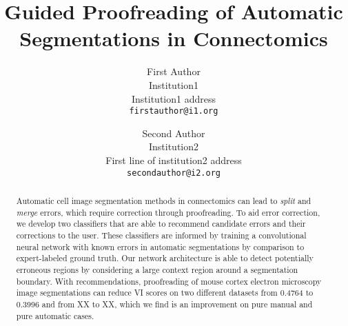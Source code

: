 \documentclass[10pt,twocolumn,letterpaper]{article}
\begin{document}
\title{Guided Proofreading of Automatic Segmentations in Connectomics}

\author{First Author\\
Institution1\\
Institution1 address\\
{\tt\small firstauthor@i1.org}
\and
Second Author\\
Institution2\\
First line of institution2 address\\
{\tt\small secondauthor@i2.org}
}

\maketitle

\begin{abstract}
Automatic cell image segmentation methods in connectomics can lead to \emph{split} and \emph{merge} errors, which require correction through proofreading. To aid error correction, we develop two classifiers that are able to recommend candidate errors and their corrections to the user. These classifiers are informed by training a convolutional neural network with known errors in automatic segmentations by comparison to expert-labeled ground truth. Our network architecture is able to detect potentially erroneous regions by considering a large context region around a segmentation boundary. With recommendations, proofreading of mouse cortex electron microscopy image segmentations can reduce VI scores on two different datasets from 0.4764 to 0.3996 and from XX to XX, which we find is an improvement on pure manual and pure automatic cases.
\end{abstract}







{\small


}
\end{document}

